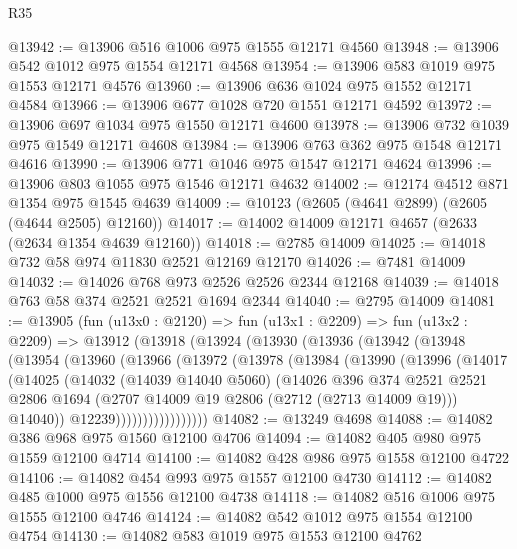 \begin{lexlean}{R35}
\begin{coremodule}
@13942 := @13906 @516 @1006 @975 @1555 @12171 @4560
@13948 := @13906 @542 @1012 @975 @1554 @12171 @4568
@13954 := @13906 @583 @1019 @975 @1553 @12171 @4576
@13960 := @13906 @636 @1024 @975 @1552 @12171 @4584
@13966 := @13906 @677 @1028 @720 @1551 @12171 @4592
@13972 := @13906 @697 @1034 @975 @1550 @12171 @4600
@13978 := @13906 @732 @1039 @975 @1549 @12171 @4608
@13984 := @13906 @763 @362 @975 @1548 @12171 @4616
@13990 := @13906 @771 @1046 @975 @1547 @12171 @4624
@13996 := @13906 @803 @1055 @975 @1546 @12171 @4632
@14002 := @12174 @4512 @871 @1354 @975 @1545 @4639
@14009 := @10123 (@2605 (@4641 @2899) (@2605 (@4644 @2505) @12160))
@14017 := @14002 @14009 @12171 @4657 (@2633 (@2634 @1354 @4639 @12160))
@14018 := @2785 @14009
@14025 := @14018 @732 @58 @974 @11830 @2521 @12169 @12170
@14026 := @7481 @14009
@14032 := @14026 @768 @973 @2526 @2526 @2344 @12168
@14039 := @14018 @763 @58 @374 @2521 @2521 @1694 @2344
@14040 := @2795 @14009
@14081 := @13905
    (fun (u13x0 : @2120) =>
    fun (u13x1 : @2209) =>
    fun (u13x2 : @2209) =>
    @13912
      (@13918
        (@13924
          (@13930
            (@13936
              (@13942
                (@13948
                  (@13954
                    (@13960
                      (@13966
                        (@13972
                          (@13978
                            (@13984
                              (@13990
                                (@13996
                                  (@14017
                                    (@14025
                                      (@14032
                                        (@14039 @14040 @5060)
                                        (@14026
                                          @396
                                          @374
                                          @2521
                                          @2521
                                          @2806
                                          @1694
                                          (@2707 @14009 @19 @2806 (@2712 (@2713 @14009 @19)))
                                          @14040))
                                      @12239)))))))))))))))))
@14082 := @13249 @4698
@14088 := @14082 @386 @968 @975 @1560 @12100 @4706
@14094 := @14082 @405 @980 @975 @1559 @12100 @4714
@14100 := @14082 @428 @986 @975 @1558 @12100 @4722
@14106 := @14082 @454 @993 @975 @1557 @12100 @4730
@14112 := @14082 @485 @1000 @975 @1556 @12100 @4738
@14118 := @14082 @516 @1006 @975 @1555 @12100 @4746
@14124 := @14082 @542 @1012 @975 @1554 @12100 @4754
@14130 := @14082 @583 @1019 @975 @1553 @12100 @4762

\end{coremodule}
\end{lexlean}

